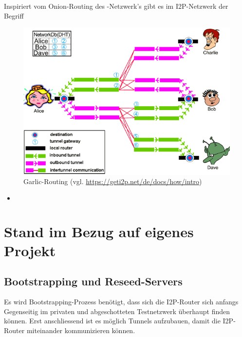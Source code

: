 Inspiriert vom Onion-Routing des -Netzwerk's gibt es im I2P-Netzwerk der Begriff

\begin{figure}[H]
    \includegraphics[width=\textwidth]{img/i2prouting.png}
    \caption{Garlic-Routing (vgl. \url{https://geti2p.net/de/docs/how/intro})}
\end{figure}

\begin{itemize}
    \item
\end{itemize}

\cite{de_boer_invisible_2019}

\cite{noauthor_intro_nodate}



\section{Stand im Bezug auf eigenes Projekt}

\subsection{Bootstrapping und Reseed-Servers}

Es wird Bootstrapping-Prozess benötigt, dass sich die I2P-Router sich anfangs Gegenseitig im privaten und abgeschotteten Testnetzwerk überhaupt finden können.
Erst anschliessend ist es möglich Tunnels aufzubauen, damit die I2P-Router miteinander kommunizieren können.


